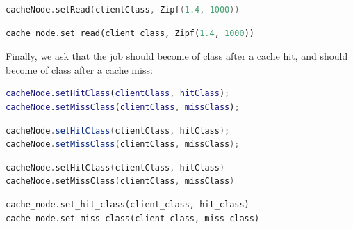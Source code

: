 \begin{KOTLIN}
\begin{lstlisting}[language = kotlin, basicstyle=\ttfamily\scriptsize]
cacheNode.setRead(clientClass, Zipf(1.4, 1000))
\end{lstlisting}
\end{KOTLIN}
\begin{PYTHON}
\begin{lstlisting}[language = python]
cache_node.set_read(client_class, Zipf(1.4, 1000))
\end{lstlisting}
\end{PYTHON}
Finally, we ask that the job should become of class  after a cache hit, and should become of class  after a cache miss:
\begin{MATLAB}
\begin{lstlisting}[language = matlab]
cacheNode.setHitClass(clientClass, hitClass);
cacheNode.setMissClass(clientClass, missClass);
\end{lstlisting}
\end{MATLAB}
\begin{JAVA}
\begin{lstlisting}[language = java, basicstyle=\ttfamily\scriptsize]
cacheNode.setHitClass(clientClass, hitClass);
cacheNode.setMissClass(clientClass, missClass);
\end{lstlisting}
\end{JAVA}
\begin{KOTLIN}
\begin{lstlisting}[language = kotlin, basicstyle=\ttfamily\scriptsize]
cacheNode.setHitClass(clientClass, hitClass)
cacheNode.setMissClass(clientClass, missClass)
\end{lstlisting}
\end{KOTLIN}
\begin{PYTHON}
\begin{lstlisting}[language = python]
cache_node.set_hit_class(client_class, hit_class)
cache_node.set_miss_class(client_class, miss_class)
\end{lstlisting}
\end{PYTHON}

